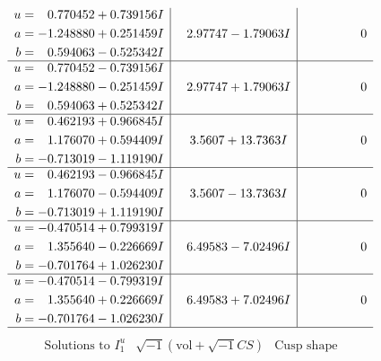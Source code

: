 \documentclass[1p]{elsarticle_modified}
\theoremstyle{definition}
\newcommand{\I}{\sqrt{-1}}
\begin{document}
$$\begin{array}{c|c|c}
\begin{aligned}
u &= \phantom{-}0.770452 + 0.739156 I \\
a &= -1.248880 + 0.251459 I \\
b &= \phantom{-}0.594063 - 0.525342 I\end{aligned}
 & \phantom{-}2.97747 - 1.79063 I & \phantom{-0.000000 } 0 \\ \hline\begin{aligned}
u &= \phantom{-}0.770452 - 0.739156 I \\
a &= -1.248880 - 0.251459 I \\
b &= \phantom{-}0.594063 + 0.525342 I\end{aligned}
 & \phantom{-}2.97747 + 1.79063 I & \phantom{-0.000000 } 0 \\ \hline\begin{aligned}
u &= \phantom{-}0.462193 + 0.966845 I \\
a &= \phantom{-}1.176070 + 0.594409 I \\
b &= -0.713019 - 1.119190 I\end{aligned}
 & \phantom{-}3.5607 + 13.7363 I & \phantom{-0.000000 } 0 \\ \hline\begin{aligned}
u &= \phantom{-}0.462193 - 0.966845 I \\
a &= \phantom{-}1.176070 - 0.594409 I \\
b &= -0.713019 + 1.119190 I\end{aligned}
 & \phantom{-}3.5607 - 13.7363 I & \phantom{-0.000000 } 0 \\ \hline\begin{aligned}
u &= -0.470514 + 0.799319 I \\
a &= \phantom{-}1.355640 - 0.226669 I \\
b &= -0.701764 + 1.026230 I\end{aligned}
 & \phantom{-}6.49583 - 7.02496 I & \phantom{-0.000000 } 0 \\ \hline\begin{aligned}
u &= -0.470514 - 0.799319 I \\
a &= \phantom{-}1.355640 + 0.226669 I \\
b &= -0.701764 - 1.026230 I\end{aligned}
 & \phantom{-}6.49583 + 7.02496 I & \phantom{-0.000000 } 0\\
 \hline 
 \end{array}$$\newpage$$\begin{array}{c|c|c}  
\text{Solutions to }I^u_{1}& \I (\text{vol} + \sqrt{-1}CS) & \text{Cusp shape}\\

\end{array}$$
\end{document}
